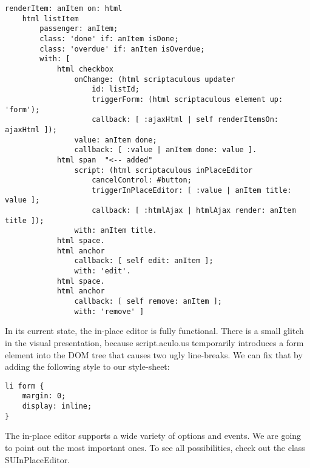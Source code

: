 \documentclass[a4paper,10pt,twoside]{book}
\newcommand{\ct}[1]{{\small\ttfamily\textup{#1}}}
\begin{document}
\begin{lstlisting}
renderItem: anItem on: html
    html listItem
        passenger: anItem;
        class: 'done' if: anItem isDone;
        class: 'overdue' if: anItem isOverdue;
        with: [
            html checkbox
                onChange: (html scriptaculous updater
                    id: listId;
                    triggerForm: (html scriptaculous element up: 'form');
                    callback: [ :ajaxHtml | self renderItemsOn: ajaxHtml ]);
                value: anItem done;
                callback: [ :value | anItem done: value ].
            html span  "<-- added"
                script: (html scriptaculous inPlaceEditor
                    cancelControl: #button;
                    triggerInPlaceEditor: [ :value | anItem title: value ];
                    callback: [ :htmlAjax | htmlAjax render: anItem title ]);
                with: anItem title.
            html space.
            html anchor
                callback: [ self edit: anItem ];
                with: 'edit'.
            html space.
            html anchor
                callback: [ self remove: anItem ];
                with: 'remove' ]
\end{lstlisting}

In its current state, the in-place editor is fully functional. There is a small glitch in the visual presentation, because script.aculo.us temporarily introduces a \ct{form} element into the DOM tree that causes two ugly line-breaks. We can fix that by adding the following style to our style-sheet:

\begin{lstlisting}
li form {
    margin: 0;
    display: inline;
}
\end{lstlisting}

The in-place editor supports a wide variety of options and events. We are going to point out the most important ones. To see all possibilities, check out the class  \ct{SUInPlaceEditor}.
\end{document}
